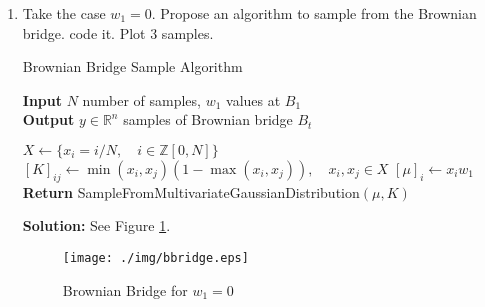 \documentclass{article}[12pt]
\begin{document}
\begin{enumerate}
\item Take the case $w_1=0$. Propose an algorithm to sample from the Brownian bridge. code it. Plot 3 samples.

\begin{algorithm}
	\caption{Brownian Bridge Sample Algorithm} 
 \hspace*{\algorithmicindent} \textbf{Input} $N$ number of samples, $w_1$ values at $B_1$ \\	
 \hspace*{\algorithmicindent} \textbf{Output} $y \in \mathbb R^n$ samples of Brownian bridge $B_t$ 
 \begin{algorithmic}[1]
	 \State $X \leftarrow \{x_i = {i}/{N}, \quad i \in \mathbb Z[0, N]\}$
	 \State $[K]_{ij} \leftarrow \operatorname{min}(x_i, x_j)(1- \operatorname{max}(x_i, x_j)), \quad x_i, x_j \in X$
	 \State $[\mu]_i \leftarrow x_i w_1$  
	 \State \textbf{Return} SampleFromMultivariateGaussianDistribution$ \left( \mu, K \right)$
 \end{algorithmic}
\end{algorithm}

	\textbf{Solution: }See Figure \ref{fig:bbridge}.

\begin{figure}
	\centering
	\texttt{[image: ./img/bbridge.eps]}
	\caption{Brownian Bridge for $w_1=0$}%
	\label{fig:bbridge}
\end{figure}
 
\end{enumerate}
\end{document}
